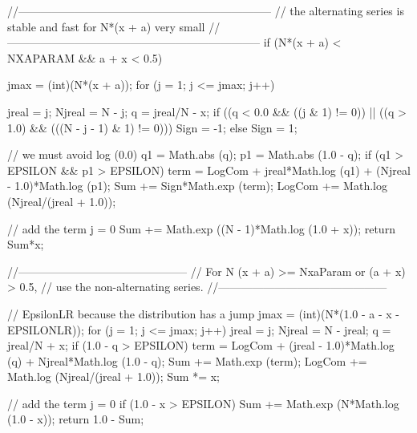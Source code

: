 \begin{code}
\begin{hide}
{      //--------------------------------------------------------------------
      // the alternating series is stable and fast for N*(x + a) very small
      //--------------------------------------------------------------------
      if (N*(x + a) < NXAPARAM && a + x < 0.5) {
         jmax = (int)(N*(x + a));
         for (j = 1; j <= jmax; j++) {
            jreal = j;
            Njreal = N - j;
            q = jreal/N - x;
            if ((q < 0.0 && ((j & 1) != 0)) ||
               ((q > 1.0) && (((N - j - 1) & 1) != 0)))
               Sign = -1;
            else
               Sign = 1;

            // we must avoid log (0.0)
            q1 = Math.abs (q);
            p1 = Math.abs (1.0 - q);
            if (q1 > EPSILON && p1 > EPSILON) {
               term = LogCom + jreal*Math.log (q1) +
                     (Njreal - 1.0)*Math.log (p1);
               Sum += Sign*Math.exp (term);
            }
            LogCom += Math.log (Njreal/(jreal + 1.0));
         }
         // add the term j = 0
         Sum += Math.exp ((N - 1)*Math.log (1.0 + x));
         return Sum*x;
      }

      //---------------------------------------------
      // For N (x + a) >= NxaParam or (a + x) > 0.5,
      // use the non-alternating series.
      //---------------------------------------------

      // EpsilonLR because the distribution has a jump
      jmax = (int)(N*(1.0 - a - x - EPSILONLR));
      for (j = 1; j <= jmax; j++) {
         jreal = j;
         Njreal = N - jreal;
         q = jreal/N + x;
         if (1.0 - q > EPSILON) {
            term = LogCom + (jreal - 1.0)*Math.log (q) + Njreal*Math.log (1.0 - q);
            Sum += Math.exp (term);
         }
         LogCom += Math.log (Njreal/(jreal + 1.0));
      }
      Sum *= x;

      // add the term j = 0
      if (1.0 - x > EPSILON)
         Sum += Math.exp (N*Math.log (1.0 - x));
      return 1.0 - Sum;
   }\end{hide}
\end{code}
